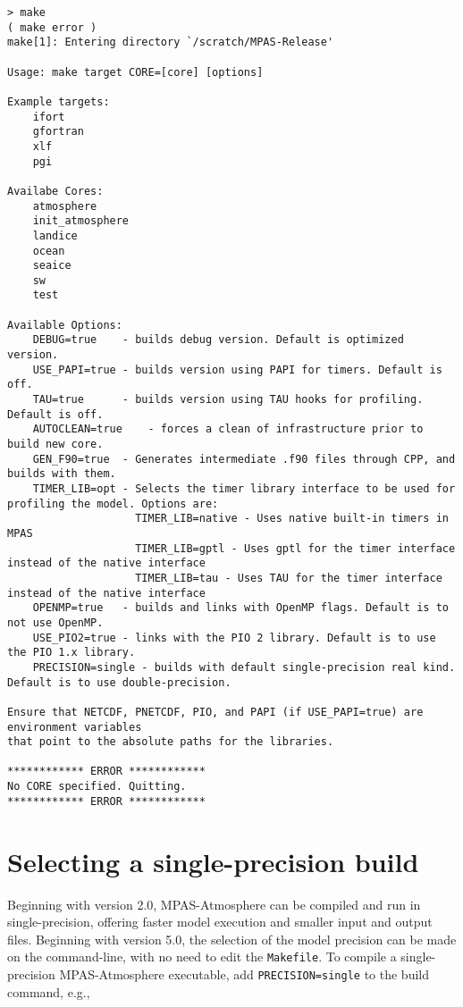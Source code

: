 {\small
\begin{verbatim}
> make
( make error )
make[1]: Entering directory `/scratch/MPAS-Release'

Usage: make target CORE=[core] [options]

Example targets:
    ifort
    gfortran
    xlf
    pgi

Availabe Cores:
    atmosphere
    init_atmosphere
    landice
    ocean
    seaice
    sw
    test

Available Options:
    DEBUG=true    - builds debug version. Default is optimized version.
    USE_PAPI=true - builds version using PAPI for timers. Default is off.
    TAU=true      - builds version using TAU hooks for profiling. Default is off.
    AUTOCLEAN=true    - forces a clean of infrastructure prior to build new core.
    GEN_F90=true  - Generates intermediate .f90 files through CPP, and builds with them.
    TIMER_LIB=opt - Selects the timer library interface to be used for profiling the model. Options are:
                    TIMER_LIB=native - Uses native built-in timers in MPAS
                    TIMER_LIB=gptl - Uses gptl for the timer interface instead of the native interface
                    TIMER_LIB=tau - Uses TAU for the timer interface instead of the native interface
    OPENMP=true   - builds and links with OpenMP flags. Default is to not use OpenMP.
    USE_PIO2=true - links with the PIO 2 library. Default is to use the PIO 1.x library.
    PRECISION=single - builds with default single-precision real kind. Default is to use double-precision.

Ensure that NETCDF, PNETCDF, PIO, and PAPI (if USE_PAPI=true) are environment variables
that point to the absolute paths for the libraries.

************ ERROR ************
No CORE specified. Quitting.
************ ERROR ************
\end{verbatim}

\section{Selecting a single-precision build}
\label{sec:build_single_prec}

Beginning with version 2.0, MPAS-Atmosphere can be compiled and run in single-precision, offering faster 
model execution and smaller input and output files. Beginning with version 5.0, the selection of the
model precision can be made on the command-line, with no need to edit the {\tt Makefile}.
To compile a single-precision MPAS-Atmosphere executable, add {\tt PRECISION=single} to the build command, e.g.,

}
